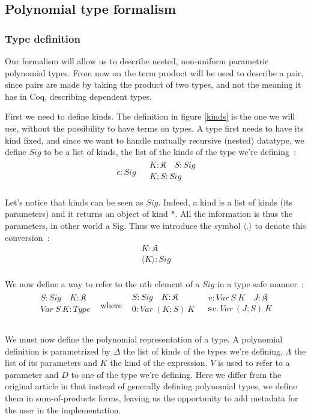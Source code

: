 \documentclass{article}
\newcommand{\msig}[1]{\langle {#1} \rangle}
\newcommand{\K}{\mathfrak{K}}
\newcommand{\suc}{\mathbf{s}}
\newcommand{\irule}[2]{\begin{array}{c} {#1} \\\hline {#2}\\ \end{array}}
\begin{document}
\subsection{Polynomial type formalism}

\subsubsection{Type definition}

Our formalism will allow us to describe nested, non-uniform parametric
polynomial types. From now on the term product will be used to describe a pair,
since pairs are made by taking the product of two types, and not the meaning
it has in Coq, describing dependent types.

First we need to define kinds. The definition in figure \ref{kinds} is the
one we will use, without the possibility to have terms on types. A type
first needs to have its kind fixed, and since we want to handle mutually recursive
(nested) datatype, we define $Sig$ to be a list of kinds, the list of the kinds
of the type we're defining~:
\[\begin{array}{cc}
    \irule{}{\epsilon : Sig} & \irule{K : \K\quad S : Sig}{K;S : Sig}
\end{array}\]

Let's notice that kinds can be seen as $Sig$. Indeed, a kind is a list of kinds
(its parameters) and it returns an object of kind  $*$. All the information is
thus the parameters, in other world a Sig. Thus we introduce the symbol $\msig{.}$
to denote this conversion~:
\[\irule{K : \K}{\msig{K} : Sig}\]

We now define a way to refer to the nth element of a $Sig$ in a type safe
manner~:
\[\begin{array}{cccc}
      \irule{S : Sig\quad K : \K}{Var\ S\ K : Type}
    & \text{where}
    & \irule{S : Sig\quad K : \K}{0 : Var\ (K;S)\ K}
    & \irule{v : Var\ S\ K\quad J : \K}{\suc v : Var\ (J;S)\ K} \\
\end{array}\]

We must now define the polynomial representation of a type. A polynomial
definition is parametrized by $\Delta$ the list of kinds of the types we're
defining, $\Lambda$ the list of its parameters and $K$ the kind of the expression.
$V$ is used to refer to a parameter and $D$ to one of the type we're defining.
Here we differ from the original article in that instead of generally defining
polynomial types, we define them in sum-of-products forms, leaving us the
opportunity to add metadata for the user in the implementation.
\end{document}
